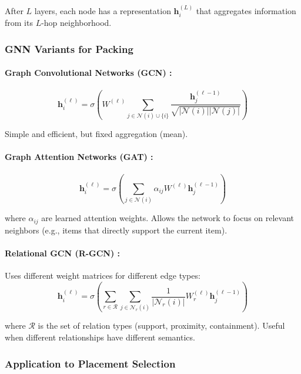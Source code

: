 After $L$ layers, each node has a representation $\mathbf{h}_i^{(L)}$ that aggregates information from its $L$-hop neighborhood.

\subsubsection{GNN Variants for Packing}

\paragraph{Graph Convolutional Networks (GCN) \cite{KW17}:}
\begin{equation}
\mathbf{h}_i^{(\ell)} = \sigma\left(W^{(\ell)} \sum_{j \in \mathcal{N}(i) \cup \{i\}} \frac{\mathbf{h}_j^{(\ell-1)}}{\sqrt{|\mathcal{N}(i)||\mathcal{N}(j)|}}\right)
\end{equation}

Simple and efficient, but fixed aggregation (mean).

\paragraph{Graph Attention Networks (GAT) \cite{VCC+18}:}
\begin{equation}
\mathbf{h}_i^{(\ell)} = \sigma\left(\sum_{j \in \mathcal{N}(i)} \alpha_{ij} W^{(\ell)} \mathbf{h}_j^{(\ell-1)}\right)
\end{equation}

where $\alpha_{ij}$ are learned attention weights. Allows the network to focus on relevant neighbors (e.g., items that directly support the current item).

\paragraph{Relational GCN (R-GCN) \cite{SKB+18}:}

Uses different weight matrices for different edge types:
\begin{equation}
\mathbf{h}_i^{(\ell)} = \sigma\left(\sum_{r \in \mathcal{R}} \sum_{j \in \mathcal{N}_r(i)} \frac{1}{|\mathcal{N}_r(i)|} W_r^{(\ell)} \mathbf{h}_j^{(\ell-1)}\right)
\end{equation}

where $\mathcal{R}$ is the set of relation types (support, proximity, containment). Useful when different relationships have different semantics.

\subsubsection{Application to Placement Selection}

